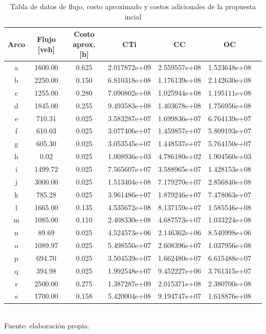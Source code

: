 \documentclass[letterpaper,12pt]{article}
\begin{document}
\begin{table}[H]
    \centering
    \caption{Tabla de datos de flujo, costo aproximado y costos adicionales de la propuesta incial}
    \begin{tabular}{ccccccc}
        \toprule
        \textbf{Arco} & \textbf{Flujo [veh]} & \textbf{Costo aprox. [h]} & \textbf{CTi} & \textbf{CC} & \textbf{OC} \\
        \midrule
        a & 1600.00 & 0.625 & 2.017872e+09 & 2.559557e+08 & 1.523648e+08 \\
        b & 2250.00 & 0.150 & 6.810318e+08 & 1.176139e+08 & 2.142630e+08 \\
        c & 1255.00 & 0.280 & 7.090802e+08 & 1.025944e+08 & 1.195111e+08 \\
        d & 1845.00 & 0.255 & 9.493583e+08 & 1.403678e+08 & 1.756956e+08 \\
        e & 710.31  & 0.025 & 3.583287e+07 & 1.699836e+07 & 6.764139e+07 \\
        f & 610.03  & 0.025 & 3.077406e+07 & 1.459857e+07 & 5.809193e+07 \\
        g & 605.30  & 0.025 & 3.053545e+07 & 1.448537e+07 & 5.764150e+07 \\
        h & 0.02    & 0.025 & 1.008936e+03 & 4.786180e+02 & 1.904560e+03 \\
        i & 1499.72 & 0.025 & 7.565607e+07 & 3.588965e+07 & 1.428153e+08 \\
        j & 3000.00 & 0.025 & 1.513404e+08 & 7.179270e+07 & 2.856840e+08 \\
        k & 785.28  & 0.025 & 3.961486e+07 & 1.879246e+07 & 7.478063e+07 \\
        l & 1665.00 & 0.135 & 4.535672e+08 & 8.137159e+07 & 1.585546e+08 \\
        m & 1085.00 & 0.110 & 2.408330e+08 & 4.687573e+07 & 1.033224e+08 \\
        n & 89.69   & 0.025 & 4.524573e+06 & 2.146362e+06 & 8.540998e+06 \\
        o & 1089.97 & 0.025 & 5.498550e+07 & 2.608396e+07 & 1.037956e+08 \\
        p & 694.70  & 0.025 & 3.504539e+07 & 1.662480e+07 & 6.615488e+07 \\
        q & 394.98  & 0.025 & 1.992548e+07 & 9.452227e+06 & 3.761315e+07 \\
        r & 2500.00 & 0.275 & 1.387287e+09 & 2.015371e+08 & 2.380700e+08 \\
        s & 1700.00 & 0.158 & 5.420004e+08 & 9.194747e+07 & 1.618876e+08 \\
        \bottomrule
    \end{tabular}
    \\
    Fuente: elaboración propia.
    \label{tab:datos_actualizados}
\end{table}
\end{document}
